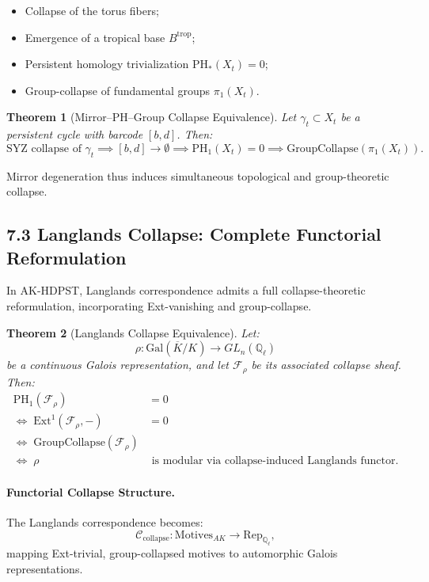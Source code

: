 \documentclass[11pt]{article}
\newtheorem{theorem}{Theorem}[section]
\begin{document}
\begin{itemize}
    \item Collapse of the torus fibers;
    \item Emergence of a tropical base \( B^{\mathrm{trop}} \);
    \item Persistent homology trivialization \( \mathrm{PH}_*(X_t) = 0 \);
    \item Group-collapse of fundamental groups \( \pi_1(X_t) \).
\end{itemize}

\begin{theorem}[Mirror–PH–Group Collapse Equivalence]
Let \( \gamma_t \subset X_t \) be a persistent cycle with barcode \( [b,d] \). Then:
\[
\text{SYZ collapse of } \gamma_t \implies [b,d] \to \emptyset \implies \mathrm{PH}_1(X_t) = 0 \implies \text{GroupCollapse}(\pi_1(X_t)).
\]
\end{theorem}

Mirror degeneration thus induces simultaneous topological and group-theoretic collapse.

\subsection*{7.3 Langlands Collapse: Complete Functorial Reformulation}

In AK-HDPST, Langlands correspondence admits a full collapse-theoretic reformulation, incorporating Ext-vanishing and group-collapse.

\begin{theorem}[Langlands Collapse Equivalence]
Let:
\[
\rho: \mathrm{Gal}(\overline{K}/K) \longrightarrow GL_n(\mathbb{Q}_\ell)
\]
be a continuous Galois representation, and let \( \mathcal{F}_\rho \) be its associated collapse sheaf. Then:
\begin{align*}
\mathrm{PH}_1(\mathcal{F}_\rho) &= 0 \\
\iff\; \mathrm{Ext}^1(\mathcal{F}_\rho, -) &= 0 \\
\iff\; \mathrm{GroupCollapse}(\mathcal{F}_\rho) \\
\iff\; \rho &\text{ is modular via collapse-induced Langlands functor}.
\end{align*}
\end{theorem}

\paragraph{Functorial Collapse Structure.}
The Langlands correspondence becomes:
\[
\mathcal{C}_{\mathrm{collapse}}: \mathrm{Motives}_{AK} \longrightarrow \mathrm{Rep}_{\mathbb{Q}_\ell},
\]
mapping Ext-trivial, group-collapsed motives to automorphic Galois representations.
\end{document}
